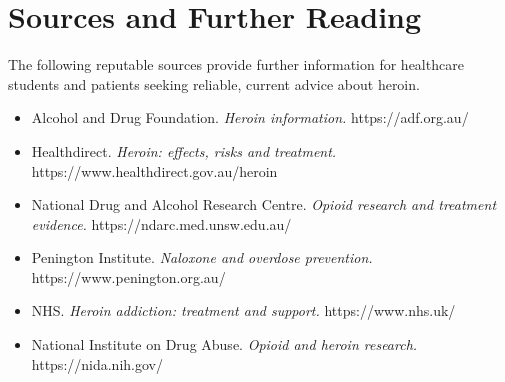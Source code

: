 \section*{Sources and Further Reading}
The following reputable sources provide further information for healthcare students and patients seeking reliable, current advice about heroin.

\begin{itemize}
    \item Alcohol and Drug Foundation. \textit{Heroin information.} https://adf.org.au/
    \item Healthdirect. \textit{Heroin: effects, risks and treatment.} https://www.healthdirect.gov.au/heroin
    \item National Drug and Alcohol Research Centre. \textit{Opioid research and treatment evidence.} https://ndarc.med.unsw.edu.au/
    \item Penington Institute. \textit{Naloxone and overdose prevention.} https://www.penington.org.au/
    \item NHS. \textit{Heroin addiction: treatment and support.} https://www.nhs.uk/
    \item National Institute on Drug Abuse. \textit{Opioid and heroin research.} https://nida.nih.gov/
\end{itemize}
